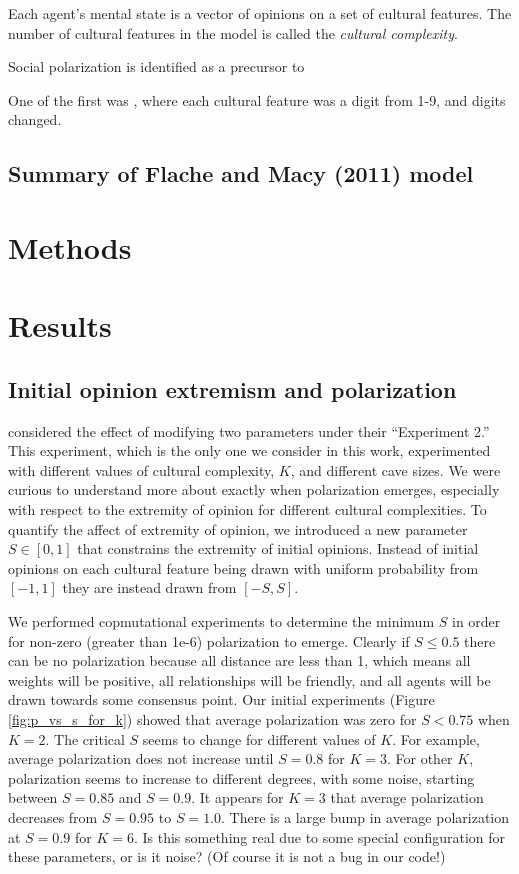 \documentclass[11pt,letterpaper]{article}
\begin{document}
Each agent's mental state is a vector of opinions on a set of cultural features.
The number of cultural features in the model is called the \emph{cultural 
complexity}. 

Social polarization is identified as a precursor to 

One of the first was \cite{Axelrod1997}, where each cultural feature was a 
digit from 1-9, and digits changed. 

\subsection{Summary of Flache and Macy (2011) model}

\section{Methods}
\label{sec:methods}

\section{Results}

\subsection{Initial opinion extremism and polarization}

 considered the effect of modifying two parameters under their
``Experiment 2.'' This experiment, which is the only one we consider in this
work, experimented with different values of cultural complexity, $K$, and 
different cave sizes. We were curious to understand more about exactly when
polarization emerges, especially with respect to the extremity of opinion
for different cultural complexities. To quantify the affect of extremity of
opinion, we introduced a new parameter $S \in [0, 1]$ that constrains the
extremity of initial opinions. Instead of initial opinions on each
cultural feature being drawn with uniform probability from $[-1, 1]$ they are
instead drawn from $[-S, S]$. 

We performed copmutational experiments to determine the minimum $S$ 
in order for non-zero (greater than 1e-6) polarization to emerge. Clearly if 
$S\leq0.5$ there can be no polarization because all distance are less than 1,
which means all weights will be positive, all
relationships will be friendly, and all agents will be drawn towards some 
consensus point. Our initial experiments (Figure \ref{fig:p_vs_s_for_k})
showed that average polarization was zero for $S < 0.75$ when $K=2$. 
The critical $S$ seems to change for different values of $K$. For example,
average polarization does not increase until $S=0.8$ for $K=3$. For other $K$,
polarization seems to increase to different degrees, with some noise, starting
between $S=0.85$ and $S=0.9$. It appears for $K=3$ that average polarization
decreases from $S=0.95$ to $S=1.0$. There is a large bump in average 
polarization at $S=0.9$ for $K=6$. Is this something real due to some special
configuration for these parameters, or is it noise? (Of course it is not a bug
in our code!)
\end{document}
